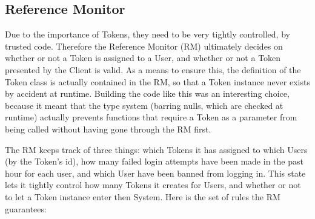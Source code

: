 \documentclass{article}
\begin{document}
\subsection{Reference Monitor}
\label{sub:reference_monitor}
\par Due to the importance of Tokens, they need to be very tightly controlled, by trusted code. Therefore the Reference Monitor (RM) ultimately decides on whether or not a Token is assigned to a User, and whether or not a Token presented by the Client is valid. As a means to ensure this, the definition of the Token class is actually contained in the RM, so that a Token instance never exists by accident at runtime. Building the code like this was an interesting choice, because it meant that the type system (barring nulls, which are checked at runtime) actually prevents functions that require a Token as a parameter from being called without having gone through the RM first.
\par The RM keeps track of three things: which Tokens it has assigned to which Users (by the Token's id), how many failed login attempts have been made in the past hour for each user, and which User have been banned from logging in. This state lets it tightly control how many Tokens it creates for Users, and whether or not to let a Token instance enter then System. Here is the set of rules the RM guarantees:
\end{document}
